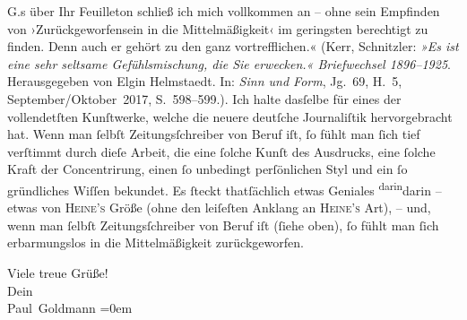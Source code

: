 {{{                        G.s über Ihr Feuilleton schließ ich mich
                     vollkommen an – ohne sein Empfinden von ›Zurückgeworfensein in die
                     Mittelmäßigkeit‹ im geringsten berechtigt zu finden. Denn auch er gehört zu den
                     ganz vortrefflichen.« (Kerr, Schnitzler: \emph{»Es ist eine sehr seltsame
                        Gefühlsmischung, die Sie erwecken.« Briefwechsel 1896–1925}.
                     Herausgegeben von Elgin Helmstaedt. In: \emph{Sinn und Form},
                     Jg. 69, H. 5, September/Oktober 2017, S. 598–599.)}}}\label{K_L02899-1}.
               Ich halte dasſelbe für eines der vollendetſten Kunſtwerke, welche die neuere deutſche Journaliſtik
               hervorgebracht hat. Wenn man{ }ſelbſt Zeitungsſchreiber von Beruf iſt,{ }ſo fühlt man{ }ſich tief verſtimmt durch  dieſe Arbeit, die eine{ }ſolche Kunſt
               des Ausdrucks, eine{ }ſolche Kraft der Concentrirung, einen{ }ſo unbedingt perſönlichen
               Styl und ein{ }ſo gründliches Wiſſen bekundet. Es{ }ſteckt thatſächlich etwas Geniales \substVorne{}\textsuperscript{darin}\substDazwischen{}darin\substHinten{} – {\pb}etwas von \textsc{Heine’s} Größe (ohne den leiſeſten
               Anklang an \textsc{Heine’s} Art), – und, wenn man{ }ſelbſt
               Zeitungsſchreiber von Beruf iſt (ſiehe oben),{ }ſo fühlt man{ }ſich erbarmungslos in die
               Mittelmäßigkeit zurückgeworfen.\pend
           
\pstart
           Viele treue Grüße! {\\[\baselineskip]}Dein {\\[\baselineskip]}\spacefill\mbox{Paul Goldmann}\pend
           \leftskip=0em{}\endnumbering{}  \newcommand{\dateiname}{L02899}\newcommand{\titel}{Paul Goldmann an Arthur Schnitzler, 13. 12. [1899]}\newcommand{\editorInnen}{Martin Anton Müller und Laura Untner}
